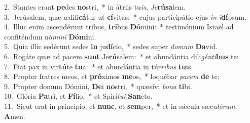 {2.~}Stantes erant \textbf{pe}des \textbf{no}stri,~* in átriis tu\textit{is}, \textit{Je}\textbf{rú}\textbf{sa}lem.\\
{3.~}Jerúsalem, quæ ædifi\textbf{cá}tur ut \textbf{cí}vitas:~* cujus participátio ejus \textit{in} \textit{i}\textbf{dí}psum.\\
{4.~}Illuc enim ascendérunt tribus, \textbf{tri}bus \textbf{Dó}mini:~* testimónium Israël ad confiténdum nó\textit{mi}\textit{ni} \textbf{Dó}\textbf{mi}ni.\\
{5.~}Quia illic sedérunt sedes \textbf{in} ju\textbf{dí}cio,~* sedes super \textit{do}\textit{mum} \textbf{Da}vid.\\
{6.~}Rogáte quæ ad pacem \textbf{sunt} Je\textbf{rú}salem:~* et abundántia dili\textit{gén}\textit{ti}\textbf{bus} te:\\
{7.~}Fiat pax in vir\textbf{tú}te \textbf{tu}a:~* et abundántia in túr\textit{ri}\textit{bus} \textbf{tu}is.\\
{8.~}Propter fratres meos, et \textbf{pró}ximos \textbf{me}os,~* loquébar \textit{pa}\textit{cem} \textbf{de} te:\\
{9.~}Propter domum Dómini, \textbf{De}i \textbf{no}stri,~* quæsívi \textit{bo}\textit{na} \textbf{ti}bi.\\
{10.~}Glória \textbf{Pa}tri, et \textbf{Fí}lio,~* et Spirí\textit{tu}\textit{i} \textbf{San}cto.\\
{11.~}Sicut erat in princípio, et \textbf{nunc}, et \textbf{sem}per,~* et in sǽcula sæcu\textit{ló}\textit{rum}. \textbf{A}men.\\

